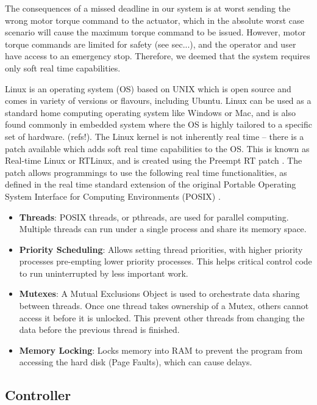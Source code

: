 \documentclass[12pt]{report}
\begin{document}
The consequences of a missed deadline in our system is at worst sending the wrong motor torque command to the actuator, which in the absolute worst case scenario will cause the maximum torque command to be issued. However, motor torque commands are limited for safety (see sec...), and the operator and user have access to an emergency stop. Therefore, we deemed that the system requires only soft real time capabilities. 

Linux is an operating system (OS) based on UNIX which is open source and comes in variety of versions or flavours, including Ubuntu. Linux can be used as a standard home computing operating system like Windows or Mac, and is also found commonly in embedded system where the OS is highly tailored to a specific set of hardware. (refs!). The Linux kernel is not inherently real time -- there is a patch available which adds soft real time capabilities to the OS. This is known as Real-time Linux or RTLinux, and is created using the Preempt RT patch \cite{SebastianSiewior2019}. The patch allows programmings to use the following real time functionalities, as defined in the real time standard extension of the original Portable Operating System Interface for Computing Environments (POSIX) \cite{Obenland}.

\begin{itemize}
	\item \textbf{Threads}: POSIX threads, or pthreads, are used for parallel computing. Multiple threads can run under a single process and share its memory space.
	\item \textbf{Priority Scheduling}: Allows setting thread priorities, with higher priority processes pre-empting lower priority processes. This helps critical control code to run uninterrupted by less important work. 
	\item \textbf{Mutexes}: A Mutual Exclusions Object is used to orchestrate data sharing between threads. Once one thread takes ownership of a Mutex, others cannot access it before it is unlocked. This prevent other threads from changing the data before the previous thread is finished. 
	\item \textbf{Memory Locking}: Locks memory into RAM to prevent the program from accessing the hard disk (Page Faults), which can cause delays. 
\end{itemize}
	
	\subsection{Controller}
	
\end{document}
